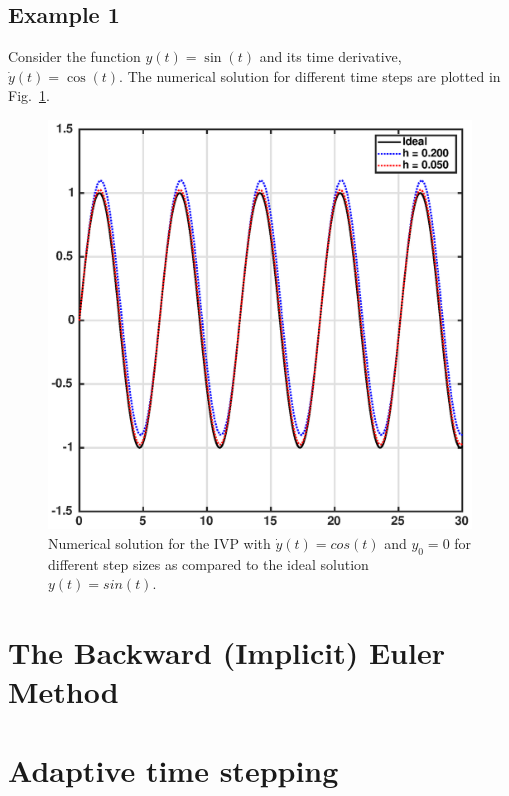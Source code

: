 \subsection{Example 1}

Consider the function $y(t) = \sin (t)$ and its time derivative, $\dot{y}(t) = \cos (t)$. The numerical solution for different time steps are plotted in Fig.~\ref{fig:IVP1}.
\begin{figure}[!b]
\centering
\includegraphics[scale=1.0]{figs/eulerTest}
\caption{Numerical solution for the IVP with $\dot{y}(t)=cos(t)$ and $y_{0}=0$ for different step sizes as compared to the ideal solution $y(t)=sin(t)$.}
\label{fig:IVP1}
\end{figure}

\section{The Backward (Implicit) Euler Method}

\section{Adaptive time stepping}